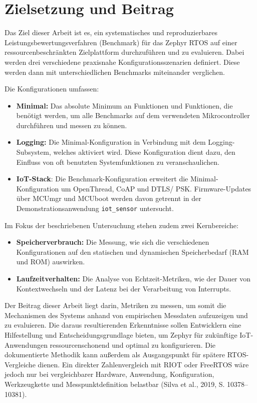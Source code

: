 \section{Zielsetzung und Beitrag}
Das Ziel dieser Arbeit ist es, ein systematisches und reproduzierbares Leistungsbewertungsverfahren (Benchmark) f{\"u}r das Zephyr RTOS auf einer ressourcenbeschr{\"a}nkten Zielplattform durchzuf{\"u}hren und zu evaluieren. Dabei werden drei verschiedene praxisnahe Konfigurationsszenarien definiert. Diese werden dann mit unterschiedlichen Benchmarks miteinander verglichen.

Die Konfigurationen umfassen:

\begin{itemize}
\item \textbf{Minimal: }Das absolute Minimum an Funktionen und Funktionen, die ben{\"o}tigt werden, um alle Benchmarks auf dem verwendeten Mikrocontroller durchf{\"u}hren und messen zu k{\"o}nnen.
\item \textbf{Logging: }Die Minimal-Konfiguration in Verbindung mit dem Logging-Subsystem, welches aktiviert wird. Diese Konfiguration dient dazu, den Einfluss von oft benutzten Systemfunktionen zu veranschaulichen.
\item \textbf{IoT-Stack}: Die Benchmark-Konfiguration erweitert die Minimal-Konfiguration um OpenThread, CoAP und DTLS/ PSK. Firmware-Updates {\"u}ber MCUmgr und MCUboot werden davon getrennt in der Demonstrationsanwendung \lstinline[style=fileinline]|iot_sensor| untersucht.
\end{itemize}
Im Fokus der beschriebenen Untersuchung stehen zudem zwei Kernbereiche:

\begin{itemize}
\item \textbf{Speicherverbrauch:} Die Messung, wie sich die verschiedenen Konfigurationen auf den statischen und dynamischen Speicherbedarf (RAM und ROM) auswirken.
\item \textbf{Laufzeitverhalten:} Die Analyse von Echtzeit-Metriken, wie der Dauer von Kontextwechseln und der Latenz bei der Verarbeitung von Interrupts.
\end{itemize}
Der Beitrag dieser Arbeit liegt darin, Metriken zu messen, um somit die Mechanismen des Systems anhand von empirischen Messdaten aufzuzeigen und zu evaluieren. Die daraus resultierenden Erkenntnisse sollen Entwicklern eine Hilfestellung und Entscheidungsgrundlage bieten, um Zephyr f{\"u}r zuk{\"u}nftige IoT-Anwendungen ressourcenschonend und optimal zu konfigurieren. Die dokumentierte Methodik kann au{\ss}erdem als Ausgangspunkt f{\"u}r sp{\"a}tere RTOS-Vergleiche dienen. Ein direkter Zahlenvergleich mit RIOT oder FreeRTOS w{\"a}re jedoch nur bei vergleichbarer Hardware, Anwendung, Konfiguration, Werkzeugkette und Messpunktdefinition belastbar (Silva et al., 2019, S. 10378--10381).


